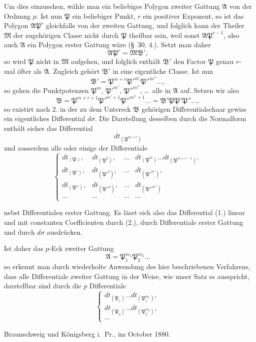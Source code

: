 \documentclass{article}
\begin{document}
Um dies einzusehen, wähle man ein beliebiges Polygon zweiter Gattung $\mathfrak{A}$ von der Ordnung $p$. Ist nun $\mathfrak{P}$ ein beliebiger Punkt, $r$ ein positiver Exponent, so ist das Polygon $\mathfrak{A}\mathfrak{P}^{r}$ gleichfalls von der zweiten Gattung, und folglich kann der Theiler $\mathfrak{M}$ der zugehörigen Classe nicht durch $\mathfrak{P}$ theilbar sein, weil sonst $\mathfrak{A}\mathfrak{P}^{r-1}$, also auch $\mathfrak{A}$ ein Polygon erster Gattung wäre (§~30, 4.). Setzt man daher
\[ \mathfrak{A}\mathfrak{P}^{r} = \mathfrak{M}\mathfrak{B}', \]
so wird $\mathfrak{P}$ nicht in $\mathfrak{M}$ aufgehen, und folglich enthält $\mathfrak{B}'$ den Factor $\mathfrak{P}$ genau $r$-mal öfter als $\mathfrak{A}$. Zugleich gehört $\mathfrak{B}'$ in eine eigentliche Classe. Ist nun
\[ \mathfrak{B}' = \mathfrak{P}^{m+r}\mathfrak{P}'^{m'}\mathfrak{P}''^{m''}\ldots, \]
so gehen die Punktpotenzen $\mathfrak{P}^{m}$, $\mathfrak{P}'^{m'}$, $\mathfrak{P}''^{m''}$, \ldots\ alle in $\mathfrak{A}$ auf. Setzen wir also
\[ \mathfrak{B} = \mathfrak{P}^{m+r+1}\mathfrak{P}'^{m'+1}\mathfrak{P}''^{m''+1}\ldots = \mathfrak{B}'\mathfrak{P}\mathfrak{P}'\mathfrak{P}''\ldots, \]
so existirt nach 2. in der zu dem Untereck $\mathfrak{B}$ gehörigen Differentialschaar gewiss ein eigentliches Differential $d\sigma$. Die Darstellung desselben durch die Normalform enthält sicher das Differential
\[ dt_{(\mathfrak{P}^{m+r})} \tag{1.} \]
und ausserdem alle oder einige der Differentiale
\[ \left\{ \begin{matrix}
dt_{(\mathfrak{P})}, & dt_{(\mathfrak{P}^{2})}, & \ldots & dt_{(\mathfrak{P}^{m})}\ldots dt_{(\mathfrak{P}^{m+r-1})}, \\
dt_{(\mathfrak{P}')}, & dt_{(\mathfrak{P}'^{2})}, & \ldots & dt_{(\mathfrak{P}'^{m'})}, \\
dt_{(\mathfrak{P}'')}, & dt_{(\mathfrak{P}''^{2})}, & \ldots & dt_{(\mathfrak{P}''^{m''})} \\
\cdots & \cdots & \cdots & \cdots
\end{matrix} \right. \tag{2.} \]

nebst Differentialen erster Gattung. Es lässt sich also das Differential (1.) linear und mit constanten Coefficienten durch (2.), durch Differentiale erster Gattung und durch $d\sigma$ ausdrücken.

Ist daher das $p$-Eck zweiter Gattung
\[ \mathfrak{A} = \mathfrak{P}_{1}^{m_{1}}\mathfrak{P}_{2}^{m_{2}}\ldots \]
so erkennt man durch wiederholte Anwendung des hier beschriebenen Verfahrens, dass alle Differentiale zweiter Gattung in der Weise, wie unser Satz es ausspricht, darstellbar sind durch die $p$ Differentiale
\[ \left\{ \begin{matrix}
dt_{(\mathfrak{P}_{1})}\ldots dt_{(\mathfrak{P}_{1}^{m_{1}})}, \\
dt_{(\mathfrak{P}_{2})}\ldots dt_{(\mathfrak{P}_{2}^{m_{2}})}, \\
\cdots
\end{matrix} \right. \tag{3.} \]

Braunschweig und Königsberg i.\ Pr., im October 1880.
\end{document}

